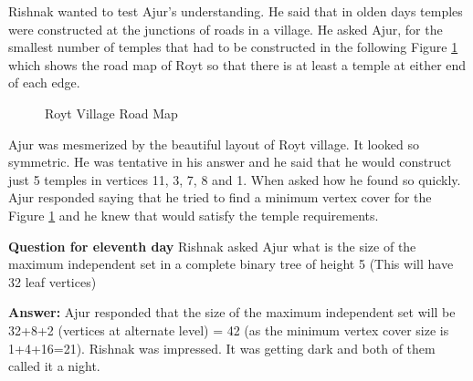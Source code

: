 Rishnak wanted to test Ajur's understanding. He said that in olden days temples were constructed at the junctions of roads in a village. He asked Ajur, for the smallest number of temples that had to be constructed in the following Figure \ref{13g6} which shows the road map of Royt so that there is at least a temple at either end of each edge.
\begin{figure}
\begin{center}

\caption{ Royt Village Road Map}\label{13g6}
\end{center}
\end{figure}

Ajur was mesmerized by the beautiful layout of Royt village. It looked so symmetric. He was tentative in his answer and he said that he would construct just 5 temples in vertices 11, 3, 7, 8 and 1.   When asked how he found so quickly. Ajur responded saying that he tried to find a minimum vertex cover for the Figure \ref{13g6} and he knew that would satisfy the temple requirements.

\textbf{Question for eleventh day} Rishnak asked Ajur what is the size of the maximum independent set in a complete binary tree of height 5 (This will have 32 leaf vertices)

\textbf{Answer:} Ajur responded that the size of the maximum independent set will be 32+8+2 (vertices at alternate level) = 42 (as the minimum vertex cover size is 1+4+16=21).
Rishnak was impressed. It was getting dark and both of them called it a night.
